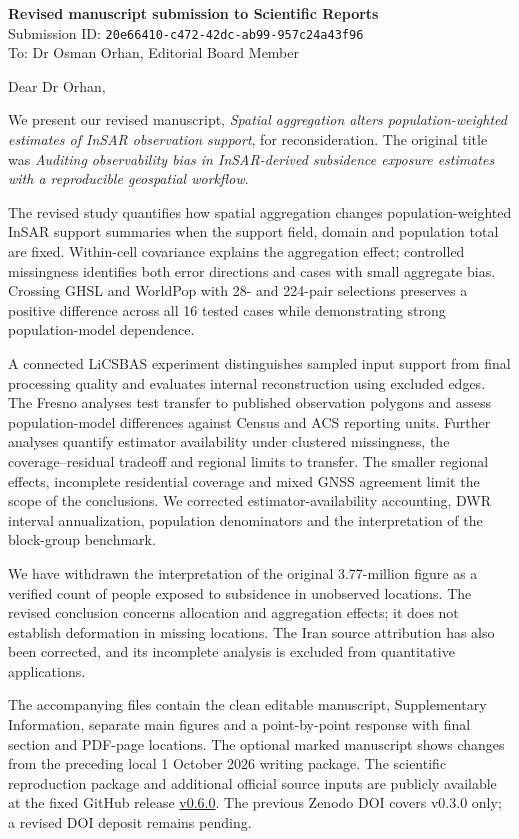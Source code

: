 \documentclass[11pt,a4paper]{article}
\begin{document}
\textbf{Revised manuscript submission to Scientific Reports}\\
Submission ID: \texttt{20e66410-c472-42dc-ab99-957c24a43f96}\\
To: Dr Osman Orhan, Editorial Board Member

Dear Dr Orhan,

We present our revised manuscript, \emph{Spatial aggregation alters population-weighted estimates of InSAR observation support}, for reconsideration. The original title was \emph{Auditing observability bias in InSAR-derived subsidence exposure estimates with a reproducible geospatial workflow}.

The revised study quantifies how spatial aggregation changes population-weighted InSAR support summaries when the support field, domain and population total are fixed. Within-cell covariance explains the aggregation effect; controlled missingness identifies both error directions and cases with small aggregate bias. Crossing GHSL and WorldPop with 28- and 224-pair selections preserves a positive difference across all 16 tested cases while demonstrating strong population-model dependence.

A connected LiCSBAS experiment distinguishes sampled input support from final processing quality and evaluates internal reconstruction using excluded edges. The Fresno analyses test transfer to published observation polygons and assess population-model differences against Census and ACS reporting units. Further analyses quantify estimator availability under clustered missingness, the coverage--residual tradeoff and regional limits to transfer. The smaller regional effects, incomplete residential coverage and mixed GNSS agreement limit the scope of the conclusions. We corrected estimator-availability accounting, DWR interval annualization, population denominators and the interpretation of the block-group benchmark.

We have withdrawn the interpretation of the original 3.77-million figure as a verified count of people exposed to subsidence in unobserved locations. The revised conclusion concerns allocation and aggregation effects; it does not establish deformation in missing locations. The Iran source attribution has also been corrected, and its incomplete analysis is excluded from quantitative applications.

The accompanying files contain the clean editable manuscript, Supplementary Information, separate main figures and a point-by-point response with final section and PDF-page locations. The optional marked manuscript shows changes from the preceding local 1 October 2026 writing package. The scientific reproduction package and additional official source inputs are publicly available at the fixed GitHub release \href{https://github.com/niubisile-wq/openinsar-observability-bias/releases/tag/v0.6.0}{v0.6.0}. The previous Zenodo DOI covers v0.3.0 only; a revised DOI deposit remains pending.
\end{document}
